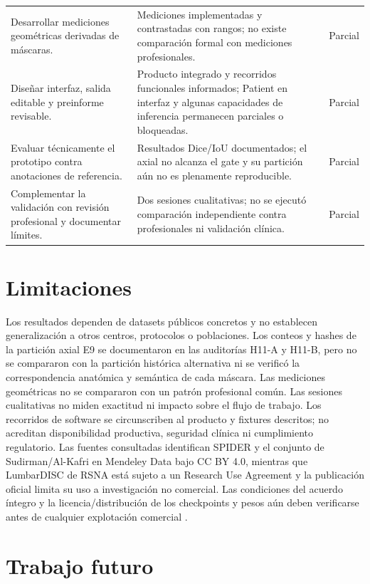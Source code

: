 \begin{longtable}{>{\raggedright\arraybackslash}p{} >{\raggedright\arraybackslash}p{} >{\raggedright\arraybackslash}p{}}
Desarrollar mediciones geométricas derivadas de máscaras. & Mediciones implementadas y contrastadas con rangos; no existe comparación formal con mediciones profesionales. & Parcial \\
Diseñar interfaz, salida editable y preinforme revisable. & Producto integrado y recorridos funcionales informados; Patient en interfaz y algunas capacidades de inferencia permanecen parciales o bloqueadas. & Parcial \\
Evaluar técnicamente el prototipo contra anotaciones de referencia. & Resultados Dice/IoU documentados; el axial no alcanza el gate y su partición aún no es plenamente reproducible. & Parcial \\
Complementar la validación con revisión profesional y documentar límites. & Dos sesiones cualitativas; no se ejecutó comparación independiente contra profesionales ni validación clínica. & Parcial \\
\hline
\end{longtable}

\section{Limitaciones}

Los resultados dependen de datasets públicos concretos y no establecen generalización a otros centros, protocolos o poblaciones. Los conteos y hashes de la partición axial E9 se documentaron en las auditorías H11-A y H11-B, pero no se compararon con la partición histórica alternativa ni se verificó la correspondencia anatómica y semántica de cada máscara. Las mediciones geométricas no se compararon con un patrón profesional común. Las sesiones cualitativas no miden exactitud ni impacto sobre el flujo de trabajo. Los recorridos de software se circunscriben al producto y fixtures descritos; no acreditan disponibilidad productiva, seguridad clínica ni cumplimiento regulatorio. Las fuentes consultadas identifican SPIDER y el conjunto de Sudirman/Al-Kafri en Mendeley Data bajo CC BY 4.0, mientras que LumbarDISC de RSNA está sujeto a un Research Use Agreement y la publicación oficial limita su uso a investigación no comercial. Las condiciones del acuerdo íntegro y la licencia/distribución de los checkpoints y pesos aún deben verificarse antes de cualquier explotación comercial \parencite{spider_data_terms_2026,alkafri_mendeley_dataset_2019,rsna_lumbardisc_datacard_2025,richards_lumbardisc_2026}.

\section{Trabajo futuro}

